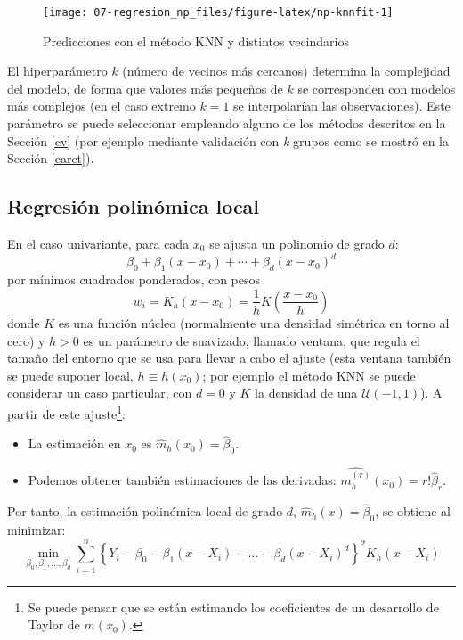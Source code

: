 \documentclass[
  spanish,
]{book}
\theoremstyle{break}
\theoremstyle{definition}
\theoremstyle{definition}
\theoremstyle{definition}
\theoremstyle{definition}
\theoremstyle{remark}
\begin{document}
\begin{figure}[!htb]

{\centering \texttt{[image: 07-regresion\_np\_files/figure-latex/np-knnfit-1]} 

}

\caption{Predicciones con el método KNN y distintos vecindarios}\label{fig:np-knnfit}
\end{figure}

El hiperparámetro \(k\) (número de vecinos más cercanos) determina la complejidad del modelo, de forma que valores más pequeños de \(k\) se corresponden con modelos más complejos (en el caso extremo \(k = 1\) se interpolarían las observaciones).
Este parámetro se puede seleccionar empleando alguno de los métodos descritos en la Sección \ref{cv} (por ejemplo mediante validación con \emph{k} grupos como se mostró en la Sección \ref{caret}).

\hypertarget{reg-locpol}{%
\subsection{Regresión polinómica local}\label{reg-locpol}}

En el caso univariante, para cada \(x_0\) se ajusta un polinomio de grado \(d\):
\[\beta_0+\beta_{1}\left(x - x_0\right) + \cdots 
+ \beta_{d}\left( x-x_0\right)^{d}\]
por mínimos cuadrados ponderados, con pesos
\[w_{i} = K_h(x - x_0) = \frac{1}{h}K\left(\frac{x-x_0}{h}\right)\]
donde \(K\) es una función núcleo (normalmente una densidad simétrica en torno al cero) y \(h>0\) es un parámetro de suavizado, llamado ventana, que regula el tamaño del entorno que se usa para llevar a cabo el ajuste
(esta ventana también se puede suponer local, \(h \equiv h(x_0)\); por ejemplo el método KNN se puede considerar un caso particular, con \(d=0\) y \(K\) la densidad de una \(\mathcal{U}(-1, 1)\)).
A partir de este ajuste\footnote{Se puede pensar que se están estimando los coeficientes de un desarrollo de Taylor de \(m(x_0)\).}:

\begin{itemize}
\item
  La estimación en \(x_0\) es \(\hat{m}_{h}(x_0)=\hat{\beta}_0\).
\item
  Podemos obtener también estimaciones de las derivadas:
  \(\widehat{m_{h}^{(r)}}(x_0) = r!\hat{\beta}_{r}\).
\end{itemize}

Por tanto, la estimación polinómica local de grado \(d\), \(\hat{m}_{h}(x)=\hat{\beta}_0\), se obtiene al minimizar:
\[\min_{\beta_0 ,\beta_1, \ldots, \beta_d} \sum_{i=1}^{n}\left\{ Y_{i} - \beta_0 
- \beta_1(x - X_i) - \ldots -\beta_d(x - X_i)^d \right\}^{2} K_{h}(x - X_i)\]
\end{document}
